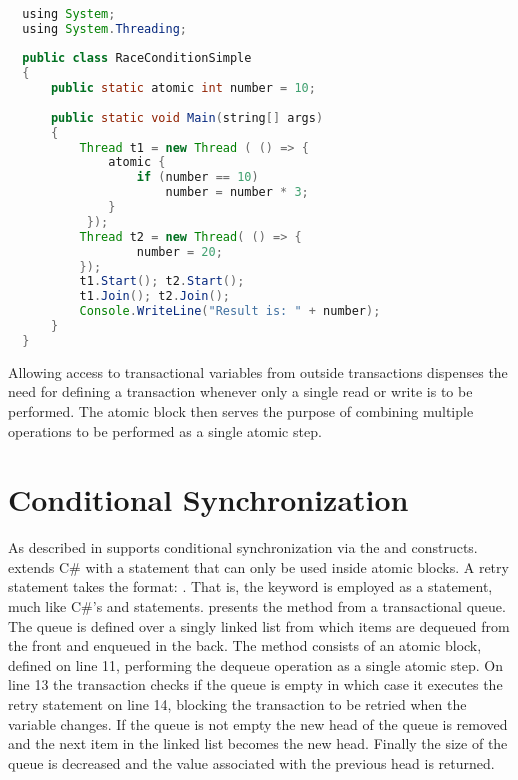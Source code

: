 \begin{lstlisting}[label=lst:stm_atomic_syntax_simplified,
  caption={Transaction Syntax Simplified},
  language=Java,  
  showspaces=false,
  showtabs=false,
  breaklines=true,
  showstringspaces=false,
  breakatwhitespace=true,
  commentstyle=\color{greencomments},
  keywordstyle=\color{bluekeywords},
  stringstyle=\color{redstrings},
  morekeywords={atomic, retry, orElse, var, get, set, using}]  % Start your code-block

  using System;
  using System.Threading;
  
  public class RaceConditionSimple
  {
      public static atomic int number = 10;
  
      public static void Main(string[] args)
      {
          Thread t1 = new Thread ( () => {
              atomic {
                  if (number == 10)           
                      number = number * 3;
              }
           });
          Thread t2 = new Thread( () => {
                  number = 20;
          });
          t1.Start(); t2.Start();
          t1.Join(); t2.Join();
          Console.WriteLine("Result is: " + number);
      }
  }
\end{lstlisting}
Allowing access to transactional variables from outside transactions dispenses the need for defining a transaction whenever only a single read or write is to be performed. The atomic block then serves the purpose of combining multiple operations to be performed as a single atomic step.

\section{Conditional Synchronization}\label{sec:sync_design}
As described in  \stmnamesp supports conditional synchronization via the  and  constructs. \stmnamesp extends C\# with a  statement that can only be used inside atomic blocks. A retry statement takes the format: . That is, the keyword is employed as a statement, much like C\#'s  and  statements\cite[p. 102]{sestoft2011c}.  presents the  method from a transactional queue. The queue is defined over a singly linked list from which items are dequeued from the front and enqueued in the back. The  method consists of an atomic block, defined on line 11, performing the dequeue operation as a single atomic step. On line 13 the transaction checks if the queue is empty in which case it executes the retry statement on line 14, blocking the transaction to be retried when the  variable changes. If the queue is not empty the new head of the queue is removed and the next item in the linked list becomes the new head. Finally the size of the queue is decreased and the value associated with the previous head is returned. 

